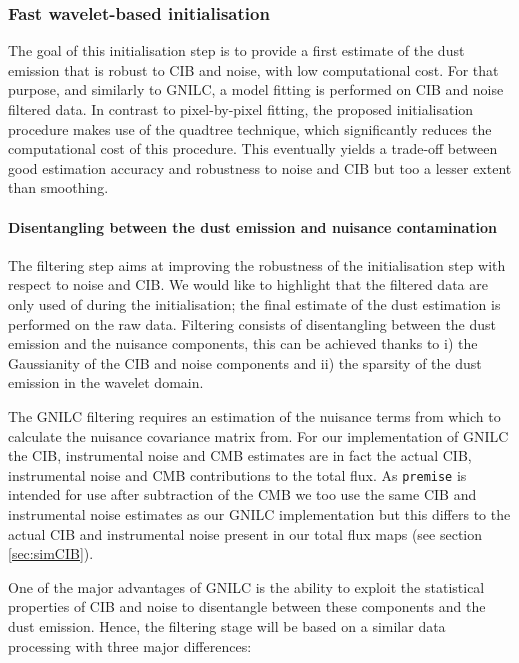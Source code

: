 \documentclass[a4paper,fleqn,usenatbib]{mnras}
\begin{document}
\subsubsection{Fast wavelet-based initialisation}

The goal of this initialisation step is to provide a first estimate of the dust emission that is robust to CIB and noise, with low computational cost. For that purpose, and similarly to GNILC, a model fitting is performed on CIB and noise filtered data. In contrast to pixel-by-pixel fitting, the proposed initialisation procedure makes use of the quadtree technique, which significantly reduces the computational cost of this procedure. This eventually yields a trade-off between good estimation accuracy and robustness to noise and CIB but too a lesser extent than smoothing.\\

\paragraph*{Disentangling between the dust emission and nuisance contamination}
 
The filtering step aims at improving the robustness of the initialisation step with respect to noise and CIB. We would like to highlight that the filtered data are only used of during the initialisation; the final estimate of the dust estimation is performed on the raw data. Filtering consists of disentangling between the dust emission and the nuisance components, this can be achieved thanks to i) the Gaussianity of the CIB and noise components and ii) the sparsity of the dust emission in the wavelet domain. 

The GNILC filtering requires an estimation of the nuisance terms from which to calculate the nuisance covariance matrix from. For our implementation of GNILC the CIB, instrumental noise and CMB estimates are in fact the actual CIB, instrumental noise and CMB contributions to the total flux. As {\tt{premise}} is intended for use after subtraction of the CMB we too use the same CIB and instrumental noise estimates as our GNILC implementation but this differs to the actual CIB and instrumental noise present in our total flux maps (see section \ref{sec:simCIB}).

One of the major advantages of GNILC is the ability to exploit the statistical properties of CIB and noise to disentangle between these components and the dust emission. Hence, the filtering stage will be based on a similar data processing with three major differences: 
 
\end{document}
